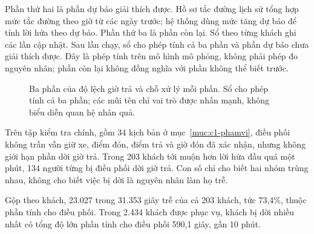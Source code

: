 Phần thứ hai là phần dự báo giải thích được. Hồ sơ tắc đường lịch sử tổng hợp mức tắc đường theo giờ từ
các ngày trước; hệ thống dùng mức tăng dự báo để tính lời hứa theo dự báo. Phần thứ ba là phần còn lại.
Sổ theo từng khách ghi các lần cập nhật. Sau lần chạy, sổ cho phép tính cả ba phần và phần dự báo chưa giải
thích được. Đây là phép tính trên mô hình mô phỏng, không phải phép đo nguyên nhân; phần còn lại
không đồng nghĩa với phần không thể biết trước.

\begin{figure}[htbp]
\centering
{}
\caption{Ba phần của độ lệch giờ trả và chỗ xử lý mỗi phần. Sổ cho phép tính cả ba phần; các mũi tên chỉ vai trò
được nhấn mạnh, không biểu diễn quan hệ nhân quả.}
\label{hinh:c1-baphan}
\end{figure}

Trên tập kiểm tra chính, gồm 34 kịch bản ở mục~\ref{muc:c1-phamvi}, điều phối không trần vẫn giữ xe, điểm đón,
điểm trả và giờ đón đã xác nhận, nhưng không giới hạn phần dời giờ trả. Trong 203 khách tới muộn hơn lời hứa
đầu quá một phút, 134 người từng bị điều phối dời giờ trả. Con số chỉ cho biết hai nhóm trùng nhau, không
cho biết việc bị dời là nguyên nhân làm họ trễ.

Gộp theo khách, 23.027 trong 31.353 giây trễ của cả 203 khách, tức 73,4\%, thuộc phần tính cho điều phối.
Trong 2.434 khách được phục vụ, khách bị dời nhiều nhất có tổng độ lớn phần tính cho điều phối 590,1 giây,
gần 10 phút.

